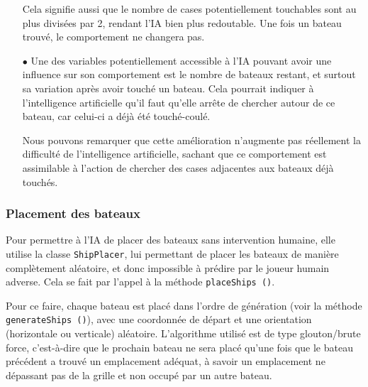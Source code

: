 \documentclass[12pt]{article}
\begin{document}
\begin{itemize}
            \bigskip

            Cela signifie aussi que le nombre de cases potentiellement
            touchables sont au plus divisées par 2, rendant l'IA bien plus
            redoutable. Une
            fois un bateau trouvé, le comportement ne changera pas.

            \bigskip

      \item[$\bullet$] Une des variables potentiellement accessible à l'IA
            pouvant avoir
            une
            influence sur son comportement est le nombre de bateaux restant, et
            surtout sa
            variation après avoir touché un bateau. Cela pourrait indiquer à
            l'intelligence
            artificielle qu'il faut qu'elle arrête de chercher autour de ce
            bateau, car
            celui-ci a déjà été touché-coulé.

            \bigskip

            Nous pouvons remarquer que cette amélioration n'augmente pas
            réellement la
            difficulté de l'intelligence artificielle, sachant que ce
            comportement est
            assimilable à l'action de chercher des cases adjacentes aux bateaux
            déjà
            touchés.

            \bigskip
\end{itemize}
\subsubsection{Placement des bateaux}
Pour permettre à l'IA de placer des bateaux sans intervention humaine, elle
utilise la classe \texttt{ShipPlacer}, lui permettant de placer les bateaux de
manière complètement aléatoire, et donc impossible à prédire par le joueur
humain adverse. Cela se fait par l'appel à la méthode \texttt{placeShips ()}.

\bigskip

Pour ce faire, chaque bateau est placé dans l'ordre de génération (voir la
méthode \texttt{generateShips ()}), avec une coordonnée de départ et une
orientation (horizontale ou verticale) aléatoire. L'algorithme utilisé est de
type glouton/brute force, c'est-à-dire que le prochain bateau ne sera placé
qu'une fois que le bateau précédent a trouvé un emplacement adéquat, à savoir
un emplacement ne dépassant pas de la grille et non occupé par un autre bateau.

\bigskip
\end{document}
